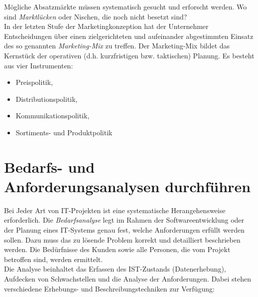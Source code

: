 \documentclass[a4paper, 12pt]{report}
\begin{document}
Mögliche Absatzmärkte müssen systematisch gesucht und erforscht werden. Wo sind 
\emph{Marktlücken} oder Nischen, die noch nicht besetzt sind? \\

In der letzten Stufe der Marketingkonzeption hat der Unternehmer Entscheidungen
über einen zielgerichteten und aufeinander abgestimmten Einsatz des so genannten
\emph{Marketing-Mix} zu treffen. Der Marketing-Mix bildet das Kernstück der 
operativen (d.h. kurzfristigen bzw. taktischen) Planung. Es besteht aus vier 
Instrumenten: 

\begin{itemize}
    \item Preispolitik,
    \item Distributionspolitik, 
    \item Kommunikationspolitik,
    \item Sortiments- und Produktpolitik
\end{itemize}

\section{Bedarfs- und Anforderungsanalysen durchführen}

Bei Jeder Art von IT-Projekten ist eine systematische Herangehensweise 
erforderlich. Die \emph{Bedarfsanalyse} legt im Rahmen der Softwareentwicklung 
oder der Planung eines IT-Systems genau fest, welche Anforderungen erfüllt 
werden sollen. Dazu muss das zu lösende Problem korrekt und detailliert 
beschrieben werden. Die Bedürfnisse des Kunden sowie alle Personen, die vom
Projekt betroffen sind, werden ermittelt. \\

Die Analyse beinhaltet das Erfassen des IST-Zustands (Datenerhebung), Aufdecken
von Schwachstellen und die Analyse der Anforderungen. Dabei stehen verschiedene 
Erhebungs- und Beschreibungstechniken zur Verfügung:
\end{document}
